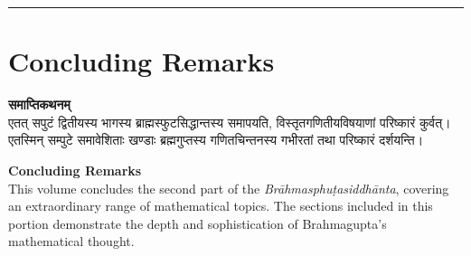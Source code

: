 \documentclass[10pt,a4paper]{article}
\newcommand{\longline}{\noindent\rule{\textwidth}{0.4pt}}
\newcommand{\bilingual}[2]{%
  \noindent%
  \begin{minipage}[t]{0.47\textwidth}%
    \setstretch{1.15}#1%
  \end{minipage}%
  \hfill%
  \vrule\hfill%
  \begin{minipage}[t]{0.47\textwidth}%
    \setstretch{1.15}#2%
  \end{minipage}%
  \par\medskip
}
\begin{document}
\vspace{0.5em}
\noindent\longline
\vspace{0.5em}

\section*{Concluding Remarks}

\bilingual{%
\textbf{समाप्तिकथनम्}\\[0.5em]
एतत् सपुटं द्वितीयस्य भागस्य ब्राह्मस्फुटसिद्धान्तस्य समापयति, विस्तृतगणितीयविषयाणां परिष्कारं कुर्वत्। एतस्मिन् सम्पुटे समावेशिताः खण्डाः ब्रह्मगुप्तस्य गणितचिन्तनस्य गभीरतां तथा परिष्कारं दर्शयन्ति।
}{%
\textbf{Concluding Remarks}\\[0.5em]
This volume concludes the second part of the \textit{Brāhmasphuṭasiddhānta}, covering an extraordinary range of mathematical topics. The sections included in this portion demonstrate the depth and sophistication of Brahmagupta's mathematical thought.
}
\end{document}
